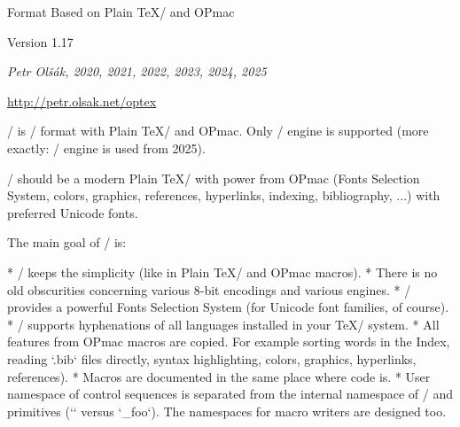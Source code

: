 

  \let\enddocument=\endinput

\typosize[10/12]  %

\begingroup \typosize [11/13.5] %



\centerline{\rm\OpTeX}
\vskip-8mm

\tit Format Based on Plain \TeX/ and OPmac

\hfill Version 1.17

\centerline{\it Petr Olšák, 2020, 2021, 2022, 2023, 2024, 2025}

\bigskip
\centerline{\url{http://petr.olsak.net/optex}}


\bigskip
\noindent
\OpTeX/ is \LuaTeX/ format with Plain \TeX/ and OPmac. Only \LuaTeX/ engine
is supported (more exactly: \LuaHBTeX/ engine is used from 2025).

\OpTeX/ should be a modern Plain \TeX/ with power from OPmac (Fonts
Selection System, colors, graphics, references, hyperlinks,
indexing, bibliography, ...) with preferred Unicode fonts.

The main goal of \OpTeX/ is:

\begitems
* \OpTeX/ keeps the simplicity (like in Plain \TeX/ and OPmac macros).
* There is no old obscurities concerning various 8-bit encodings and
  various engines.
* \OpTeX/ provides a powerful Fonts Selection System (for Unicode font
  families, of course).
* \OpTeX/ supports hyphenations of all languages installed in your \TeX/ system.
* All features from OPmac macros are copied. For example sorting words in
  the Index, reading `.bib` files directly, syntax 
  highlighting, colors, graphics, hyperlinks, references).
* Macros are documented in the same place where code is.
* User namespace of control sequences is separated from the internal namespace
  of \OpTeX/ and primitives (`\foo` versus `\_foo`).
  The namespaces for macro writers are designed too.
\enditems

